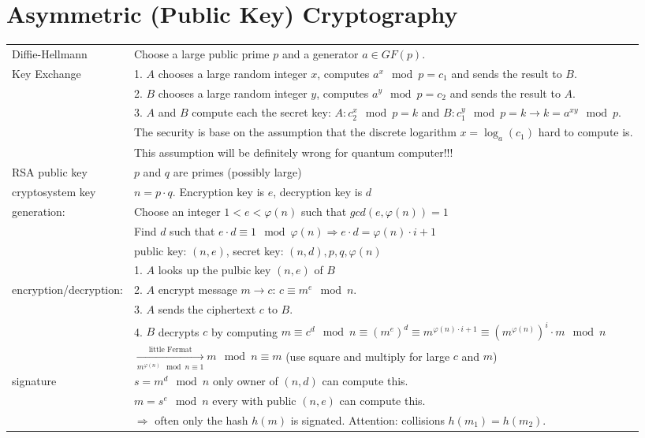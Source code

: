 \section{Asymmetric (Public Key) Cryptography}
\label{sec::CrypCod_Asymmetric Crypto}
\begin{tabular}{|l| p{14.7cm}|}
	\hline
	Diffie-Hellmann				 	& 	Choose a large public prime $p$ and a generator $a \in GF(p)$.\\
	Key Exchange					&	1. $A$ chooses a large random integer $x$, computes $a^x \mod p = c_1$ and sends the result to $B$. \\
									&	2. $B$ chooses a large random integer $y$, computes $a^y \mod p = c_2$ and sends the result to $A$. \\
									&	3. $A$ and $B$ compute each the secret key: $A: c_2^x \mod p=k $ and $B: c_1^y \mod p=k \to k=a^{xy} \mod p$.\\
									& 	The security is base on the assumption that the discrete logarithm $x=\log_{a}(c_1)$ hard to compute is.\\
									&	This assumption will be definitely wrong for quantum computer!!!\\
	\hline
	RSA public key 					&	$p$ and $q$ are primes (possibly large)\\
	cryptosystem key				&	$n=p\cdot q$. Encryption key is $e$, decryption key is $d$\\
	generation:						&	Choose an integer $1<e<\varphi(n)$ such that $gcd(e,\varphi(n))=1$\\
									&	Find $d$ such that $e\cdot d\equiv 1 \mod \varphi(n) \Rightarrow e\cdot d = \varphi(n) \cdot i + 1$\\
									&	public key: $(n,e)$, secret key: $(n,d), p,q, \varphi(n)$\\
									\cline{2-2}
									&	1. $A$ looks up the pulbic key $(n,e)$ of $B$\\
	encryption/decryption:			&	2. $A$ encrypt message $m \to c$: $c \equiv m^e \mod n$.\\
									&	3. $A$ sends the ciphertext $c$ to $B$.\\
									&	4. $B$ decrypts $c$ by computing $m\equiv c^d \mod n \equiv (m^{e})^d \equiv  m^{\varphi(n) \cdot i + 1} \equiv  \left(m^{\varphi(n)}\right)^i \cdot m \mod n$\\
									&	$\xrightarrow[m^{\varphi(n)} \mod n\equiv 1]{\text{little Fermat}} m \mod n \equiv m $  (use square and multiply for large $c$ and $m$)\\
									\cline{2-2}
	signature						&	$s=m^d \mod n$ only owner of $(n,d)$ can compute this.\\
									&	$m=s^e \mod n$ every with public $(n,e)$ can compute this.\\
									&	$\Rightarrow$ often only the hash $h(m)$ is signated. Attention: 
										collisions $h(m_1)=h(m_2)$.\\
	\hline
\end{tabular}
